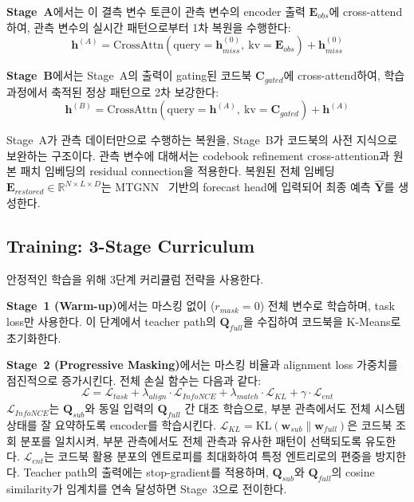 \textbf{Stage~A}에서는 이 결측 변수 토큰이 관측 변수의 encoder 출력 $\mathbf{E}_{obs}$에 cross-attend하여, 관측 변수의 실시간 패턴으로부터 1차 복원을 수행한다:
%
\begin{equation}
  \mathbf{h}^{(A)} = \mathrm{CrossAttn}(\mathrm{query}=\mathbf{h}^{(0)}_{miss},\ \mathrm{kv}=\mathbf{E}_{obs}) + \mathbf{h}^{(0)}_{miss}
\end{equation}

\textbf{Stage~B}에서는 Stage~A의 출력이 gating된 코드북 $\mathbf{C}_{gated}$에 cross-attend하여, 학습 과정에서 축적된 정상 패턴으로 2차 보강한다:
%
\begin{equation}
  \mathbf{h}^{(B)} = \mathrm{CrossAttn}(\mathrm{query}=\mathbf{h}^{(A)},\ \mathrm{kv}=\mathbf{C}_{gated}) + \mathbf{h}^{(A)}
\end{equation}

Stage~A가 관측 데이터만으로 수행하는 복원을, Stage~B가 코드북의 사전 지식으로 보완하는 구조이다. 관측 변수에 대해서는 codebook refinement cross-attention과 원본 패치 임베딩의 residual connection을 적용한다. 복원된 전체 임베딩 $\mathbf{E}_{restored} \in \mathbb{R}^{N \times L \times D}$는 MTGNN~\cite{wu2020mtgnn} 기반의 forecast head에 입력되어 최종 예측 $\hat{\mathbf{Y}}$를 생성한다.


\subsection{Training: 3-Stage Curriculum}
\label{sec:training}

안정적인 학습을 위해 3단계 커리큘럼 전략을 사용한다.

\textbf{Stage~1 (Warm-up)}에서는 마스킹 없이 ($r_{mask} = 0$) 전체 변수로 학습하며, task loss만 사용한다. 이 단계에서 teacher path의 $\mathbf{Q}_{full}$을 수집하여 코드북을 K-Means로 초기화한다.

\textbf{Stage~2 (Progressive Masking)}에서는 마스킹 비율과 alignment loss 가중치를 점진적으로 증가시킨다. 전체 손실 함수는 다음과 같다:
%
\begin{equation}
  \mathcal{L} = \mathcal{L}_{task}
    + \lambda_{align} \cdot \mathcal{L}_{InfoNCE}
    + \lambda_{match} \cdot \mathcal{L}_{KL}
    + \gamma \cdot \mathcal{L}_{ent}
\end{equation}
%
$\mathcal{L}_{InfoNCE}$는 $\mathbf{Q}_{sub}$와 동일 입력의 $\mathbf{Q}_{full}$ 간 대조 학습으로, 부분 관측에서도 전체 시스템 상태를 잘 요약하도록 encoder를 학습시킨다. $\mathcal{L}_{KL} = \mathrm{KL}(\mathbf{w}_{sub} \| \mathbf{w}_{full})$은 코드북 조회 분포를 일치시켜, 부분 관측에서도 전체 관측과 유사한 패턴이 선택되도록 유도한다. $\mathcal{L}_{ent}$는 코드북 활용 분포의 엔트로피를 최대화하여 특정 엔트리로의 편중을 방지한다. Teacher path의 출력에는 stop-gradient를 적용하며, $\mathbf{Q}_{sub}$와 $\mathbf{Q}_{full}$의 cosine similarity가 임계치를 연속 달성하면 Stage~3으로 전이한다.

